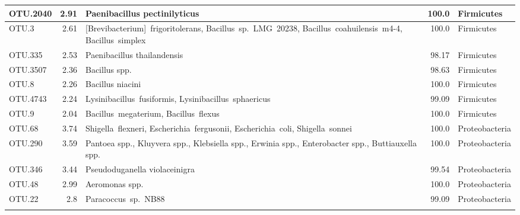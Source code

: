 \begin{longtable}{lrp{6.5cm}rl}
OTU.2040 & 2.91 & Paenibacillus pectinilyticus & 100.0 & Firmicutes \\ \midrule
OTU.3 & 2.61 & \mbox{[Brevibacterium] frigoritolerans}, \mbox{Bacillus sp. LMG 20238}, \mbox{Bacillus coahuilensis m4-4}, \mbox{Bacillus simplex} & 100.0 & Firmicutes \\ \midrule
OTU.335 & 2.53 & Paenibacillus thailandensis & 98.17 & Firmicutes \\ \midrule
OTU.3507 & 2.36 & Bacillus spp. & 98.63 & Firmicutes \\ \midrule
OTU.8 & 2.26 & Bacillus niacini & 100.0 & Firmicutes \\ \midrule
OTU.4743 & 2.24 & \mbox{Lysinibacillus fusiformis}, \mbox{Lysinibacillus sphaericus} & 99.09 & Firmicutes \\ \midrule
OTU.9 & 2.04 & \mbox{Bacillus megaterium}, \mbox{Bacillus flexus} & 100.0 & Firmicutes \\ \midrule
OTU.68 & 3.74 & \mbox{Shigella flexneri}, \mbox{Escherichia fergusonii}, \mbox{Escherichia coli}, \mbox{Shigella sonnei} & 100.0 & Proteobacteria \\ \midrule
OTU.290 & 3.59 & Pantoea spp., Kluyvera spp., Klebsiella spp., Erwinia spp., Enterobacter spp., Buttiauxella spp. & 100.0 & Proteobacteria \\ \midrule
OTU.346 & 3.44 & Pseudoduganella violaceinigra & 99.54 & Proteobacteria \\ \midrule
OTU.48 & 2.99 & Aeromonas spp. & 100.0 & Proteobacteria \\ \midrule
OTU.22 & 2.8 & \mbox{Paracoccus sp. NB88} & 99.09 & Proteobacteria \\ \midrule

    \bottomrule
\label{tab:xyl}
\end{longtable}
